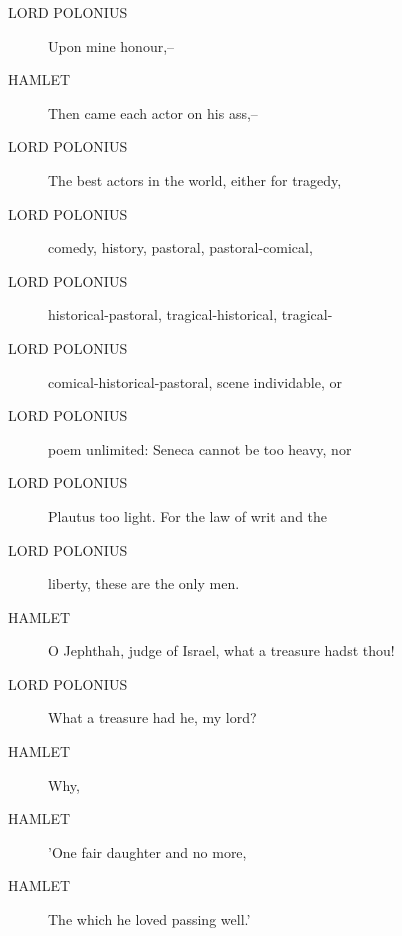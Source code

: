 \documentclass{article}
\begin{document}
\begin{description}
            
\item[LORD POLONIUS] Upon mine honour,--
\end{description}
          
\begin{description}
            
\item[HAMLET] Then came each actor on his ass,--
\end{description}
          
\begin{description}
            
\item[LORD POLONIUS] The best actors in the world, either for tragedy,
\item[LORD POLONIUS] comedy, history, pastoral, pastoral-comical,
\item[LORD POLONIUS] historical-pastoral, tragical-historical, tragical-
\item[LORD POLONIUS] comical-historical-pastoral, scene individable, or
\item[LORD POLONIUS] poem unlimited: Seneca cannot be too heavy, nor
\item[LORD POLONIUS] Plautus too light. For the law of writ and the
\item[LORD POLONIUS] liberty, these are the only men.
\end{description}
          
\begin{description}
            
\item[HAMLET] O Jephthah, judge of Israel, what a treasure hadst thou!
\end{description}
          
\begin{description}
            
\item[LORD POLONIUS] What a treasure had he, my lord?
\end{description}
          
\begin{description}
            
\item[HAMLET] Why,
\item[HAMLET] 'One fair daughter and no more,
\item[HAMLET] The which he loved passing well.'
\end{description}
          
\end{document}

